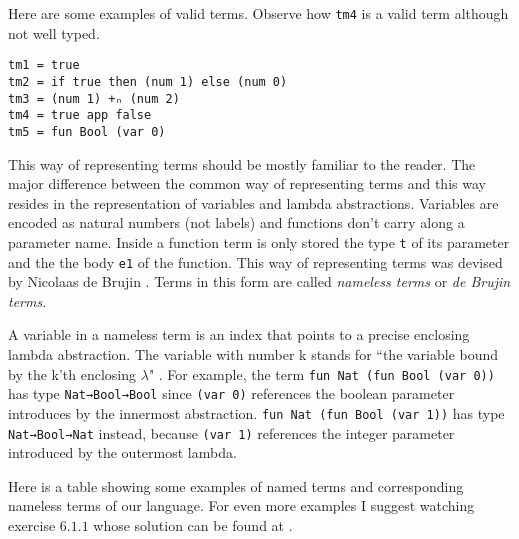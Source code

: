 \documentclass{article}
\begin{document}
Here are some examples of valid terms.
Observe how \texttt{tm4} is a valid term although not well typed.

\begin{verbatim}
tm1 = true
tm2 = if true then (num 1) else (num 0)
tm3 = (num 1) +ₙ (num 2)
tm4 = true app false
tm5 = fun Bool (var 0)
\end{verbatim}

This way of representing terms should be mostly familiar to the reader.
The major difference between the common way of representing terms and this way resides in the representation of variables and lambda abstractions.
Variables are encoded as natural numbers (not labels) and functions don't carry along a parameter name.
Inside a function term is only stored the type \texttt{t} of its parameter and the the body \texttt{e1} of the function.
This way of representing terms was devised by Nicolaas de Brujin \cite[Ch.\ 6]{pierce}.
Terms in this form are called \textit{nameless terms} or \textit{de Brujin terms}.

A variable in a nameless term is an index that points to a precise enclosing lambda abstraction.
The variable with number k stands for ``the variable bound by the k'th enclosing $\lambda$" \cite[Ch.\ 6 p.\ 76]{pierce}.
For example, the term \texttt{fun Nat (fun Bool (var 0))} has type \texttt{Nat→Bool→Bool} since \texttt{(var 0)} references the boolean parameter introduces by the innermost abstraction.
\texttt{fun Nat (fun Bool (var 1))} has type \texttt{Nat→Bool→Nat} instead, because \texttt{(var 1)} references the integer parameter introduced by the outermost lambda.


Here is a table showing some examples of named terms and corresponding nameless terms of our language.
For even more examples I suggest watching exercise $6.1.1$ \cite[p.\ 76]{pierce} whose solution can be found at \cite[p.\ 503]{pierce}.
\end{document}
